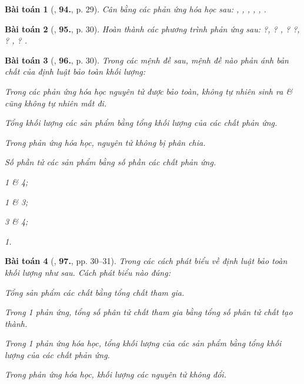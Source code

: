 \documentclass{article}
\numberwithin{equation}{section}
\newtheorem{baitoan}{Bài toán}[section]
\begin{document}
\begin{baitoan}[\cite{An2011}, \textbf{94.}, p. 29]
	Cân bằng các phản ứng hóa học sau: \emph{, , , , , }.
\end{baitoan}

\begin{baitoan}[\cite{An2011}, \textbf{95.}, p. 30]
	Hoàn thành các phương trình phản ứng sau: \emph{ ?,  ? ,  ?  ?,  ? ,  ? }.
\end{baitoan}

\begin{baitoan}[\cite{An2011}, \textbf{96.}, p. 30]
	Trong các mệnh đề sau, mệnh đề nào phản ánh bản chất của định luật bảo toàn khối lượng:
	\begin{enumerate*}
		\item[\textbf{1.}] Trong các phản ứng hóa học nguyên tử được bảo toàn, không tự nhiên sinh ra \& cũng không tự nhiên mất đi.
		\item[\textbf{2.}] Tổng khối lượng các sản phẩm bằng tổng khối lượng của các chất phản ứng.
		\item[\textbf{3.}] Trong phản ứng hóa học, nguyên tử không bị phân chia.
		\item[\textbf{4.}] Số phần tử các sản phẩm bằng số phần các chất phản ứng.
	\end{enumerate*}

	\begin{enumerate*}
		\item[{\rm\sf A.}] 1 \& 4;
		\item[{\rm\sf B.}] 1 \& 3;
		\item[{\rm\sf C.}] 3 \& 4;
		\item[{\rm\sf D.}] 1.
	\end{enumerate*}
\end{baitoan}

\begin{baitoan}[\cite{An2011}, \textbf{97.}, pp. 30--31]
	Trong các cách phát biểu về định luật bảo toàn khối lượng như sau. Cách phát biểu nào đúng:
	\begin{enumerate*}
		\item[{\rm\sf A.}] Tổng sản phẩm các chất bằng tổng chất tham gia.
		\item[{\rm\sf B.}] Trong 1 phản ứng, tổng số phân tử chất tham gia bằng tổng số phân tử chất tạo thành.
		\item[{\rm\sf C.}] Trong 1 phản ứng hóa học, tổng khối lượng của các sản phẩm bằng tổng khối lượng của các chất phản ứng.
		\item[{\rm\sf D.}] Trong phản ứng hóa học, khối lượng các nguyên tử không đổi.
	\end{enumerate*}
\end{baitoan}
\end{document}
